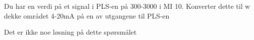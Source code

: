 


Du har en verdi p{\aa} et signal i PLS-en p{\aa} 300-3000 i MI 10. Konverter dette til w dekke omr{\aa}det 4-20mA p{\aa} en av utgangene til PLS-en 








Det er ikke noe l{\o}sning p{\aa} dette sp{\o}rsm{\aa}let













